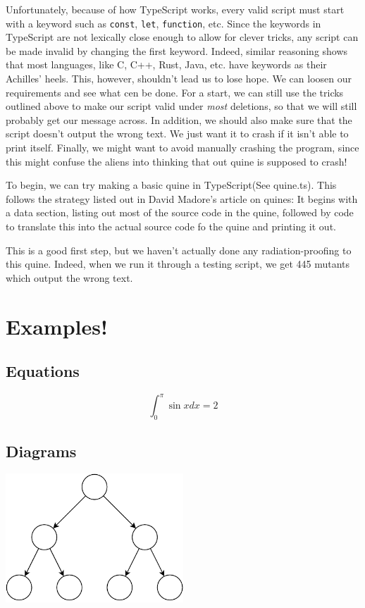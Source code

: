 \documentclass{article}
\begin{document}
Unfortunately, because of how TypeScript works, every valid script must start with a keyword such as \verb|const|, \verb|let|, \verb|function|, etc.
Since the keywords in TypeScript are not lexically close enough to allow for clever tricks, any script can be made invalid by changing the first keyword.
Indeed, similar reasoning shows that most languages, like C, C++, Rust, Java, etc. have keywords as their Achilles' heels.
This, however, shouldn't lead us to lose hope.
We can loosen our requirements and see what cen be done.
For a start, we can still use the tricks outlined above to make our script valid under \textit{most} deletions, so that we will still probably get our message across.
In addition, we should also make sure that the script doesn't output the wrong text. We just want it to crash if it isn't able to print itself.
Finally, we might want to avoid manually crashing the program, since this might confuse the aliens into thinking that out quine is supposed to crash!

To begin, we can try making a basic quine in TypeScript(See quine.ts).
This follows the strategy listed out in David Madore's article on quines:
It begins with a data section,
    listing out most of the source code in the quine,
    followed by code to translate this into the actual source code fo the quine and printing it out.

This is a good first step, but we haven't actually done any radiation-proofing to this quine.
Indeed, when we run it through a testing script, we get 445 mutants which output the wrong text.










\section*{Examples!}

\subsection*{Equations}
$$\int_{0}^{\pi}\sin x dx = 2$$

\subsection*{Diagrams}
\begin{center}
    \includegraphics[width=0.5\textwidth]{example-figure.pdf}
\end{center}
\end{document}
